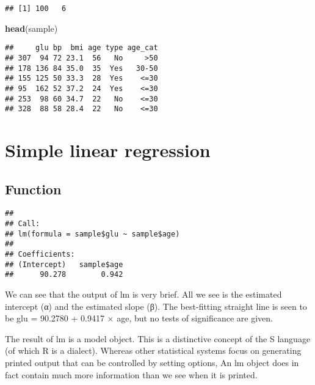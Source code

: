 \documentclass[]{book}
\newenvironment{Shaded}{\begin{snugshade}}{\end{snugshade}}
\newcommand{\KeywordTok}[1]{\textcolor[rgb]{0.13,0.29,0.53}{\textbf{#1}}}
\newcommand{\CommentTok}[1]{\textcolor[rgb]{0.56,0.35,0.01}{\textit{#1}}}
\newcommand{\OperatorTok}[1]{\textcolor[rgb]{0.81,0.36,0.00}{\textbf{#1}}}
\newcommand{\NormalTok}[1]{#1}
\theoremstyle{definition}
\theoremstyle{definition}
\theoremstyle{definition}
\theoremstyle{remark}
\begin{document}
\begin{verbatim}
## [1] 100   6
\end{verbatim}

\begin{Shaded}
\begin{Highlighting}[]
\KeywordTok{head}\NormalTok{(sample)}
\end{Highlighting}
\end{Shaded}

\begin{verbatim}
##     glu bp  bmi age type age_cat
## 307  94 72 23.1  56   No     >50
## 178 136 84 35.0  35  Yes   30-50
## 155 125 50 33.3  28  Yes    <=30
## 95  162 52 37.2  24  Yes    <=30
## 253  98 60 34.7  22   No    <=30
## 328  88 58 28.4  22   No    <=30
\end{verbatim}

\section{Simple linear regression}\label{simple-linear-regression}

\subsection{Function}\label{function}

\begin{Shaded}
\end{Shaded}

\begin{verbatim}
## 
## Call:
## lm(formula = sample$glu ~ sample$age)
## 
## Coefficients:
## (Intercept)   sample$age  
##      90.278        0.942
\end{verbatim}

We can see that the output of lm is very brief. All we see is the
estimated intercept (α) and the estimated slope (β). The best-fitting
straight line is seen to be glu = 90.2780 + 0.9417 × age, but no tests
of significance are given.

The result of lm is a model object. This is a distinctive concept of the
S language (of which R is a dialect). Whereas other statistical systems
focus on generating printed output that can be controlled by setting
options, An lm object does in fact contain much more information than we
see when it is printed.
\end{document}
